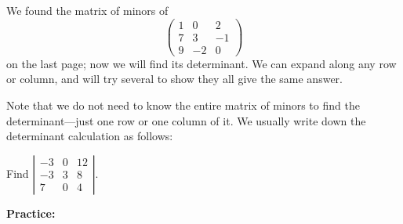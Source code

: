 \documentclass{article}
\begin{document}
\bigskip


We found the matrix of minors of
\[\left(\begin{array}{ccc}1&0&2\\7&3&-1\\9&-2&0\end{array}\right)\]
on the last page; now we will find its determinant. We can expand along any row or column, and will try several to show they all give the same answer.

\vfill


Note that we do not need to know the entire matrix of minors to find the determinant---just one row or one column of it. We usually write down the determinant calculation as follows:\medskip

Find $\left|\begin{array}{ccc}-3&0&12\\-3&3&8\\7&0&4\end{array}\right|$.

\clearpage






\textbf{Practice:}\bigskip
\end{document}
